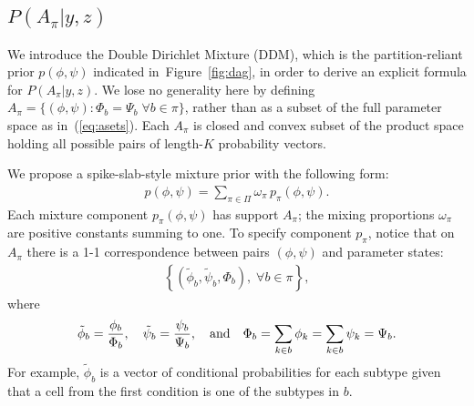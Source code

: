 \documentclass[aoas,preprint]{imsart}
\begin{document}
\subsection{$P(A_\pi|y,z)$}



We introduce the Double Dirichlet Mixture (DDM), 
which is the partition-reliant prior $p(\phi,\psi)$ indicated in~Figure~\ref{fig:dag}, 
in order to derive an explicit
formula for $P(A_\pi|y,z)$.   We lose no generality here by defining
$A_\pi = \{ (\phi,\psi): \Phi_b = \Psi_b \;  \forall b \in \pi \}$, rather than as a subset of the full
parameter space as in~(\ref{eq:asets}).   Each $A_\pi$ is closed and convex subset of the product space
holding all possible pairs of length-$K$ probability vectors.

We propose a spike-slab-style mixture prior with the following form:
\begin{eqnarray}
\label{eq:ddmix}
p(\phi,\psi) = \sum_{\pi \in \Pi} \omega_\pi  \, p_\pi(\phi,\psi ).
\end{eqnarray} 
Each mixture component $p_\pi(\phi,\psi)$ has support $A_\pi$;  
the mixing proportions $\omega_\pi$ are positive constants summing to one. 
To specify component $p_\pi$,  notice that on $A_\pi$ there is a 1-1 correspondence between pairs $(\phi, \psi)$ and 
parameter states:
\begin{eqnarray}
\label{eq:onetoone}
 \left\{ (\tilde \phi_b, \tilde \psi_b, \Phi_b), \; \forall b \in \pi \right\}, 
\end{eqnarray}
where
\begin{eqnarray*}
\tilde{\phi}_b = \frac{\phi_b}{\Phi_b}, \quad \tilde{\psi}_b = \frac{\psi_b}{\Psi_b}, \quad 
{\mbox {\rm and}} \quad \Phi_b = \sum_{k \in b} \phi_k = \sum_{k \in b} \psi_k = \Psi_b.
\end{eqnarray*}
For example, $\tilde{\phi}_b$ is a vector of conditional probabilities for each subtype given that a cell
from the first condition is one of the subtypes in $b$. 
\end{document}
